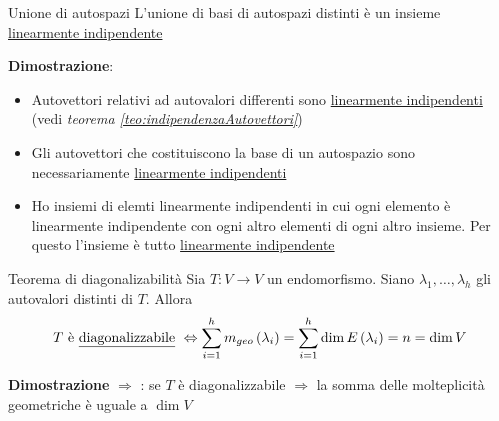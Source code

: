 \begin{teorema}{Unione di autospazi}
	L'unione di basi di autospazi distinti è un insieme \underline{linearmente indipendente}
\end{teorema}
\label{teo:unioneAutospazi}
\textbf{Dimostrazione}:
\begin{itemize}
	\item Autovettori relativi ad autovalori differenti sono \underline{linearmente indipendenti} (vedi \textit{teorema  \ref{teo:indipendenzaAutovettori}})
	\item Gli autovettori che costituiscono la base di un autospazio sono necessariamente \underline{linearmente indipendenti}
	\item Ho insiemi di elemti linearmente indipendenti in cui ogni elemento è linearmente indipendente con ogni altro elementi di ogni altro insieme. Per questo l'insieme è tutto \underline{linearmente indipendente}
\end{itemize}
\begin{teorema}{Teorema di diagonalizabilità}
	Sia $ T: V \to V $ un endomorfismo. Siano $ \lambda_1,\ldots, \lambda_h $ gli autovalori distinti di $ T $. Allora
	\[
		T  \text{ è \underline{diagonalizzabile} } \Leftrightarrow \sum_{i=1}^{h} m_{geo}\left( \lambda_i \right) = \sum_{i=1}^{h} \dim E \left( \lambda_i \right) =n = \dim V
	\]
\end{teorema}
\textbf{Dimostrazione} $ \Rightarrow $ : se $ T $ è diagonalizzabile $ \Rightarrow $ la somma delle molteplicità geometriche è uguale a $ \dim V $

